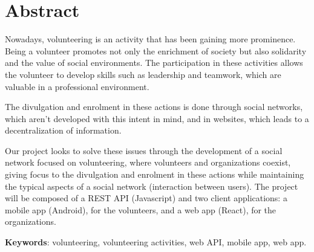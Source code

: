 \section*{Abstract}
Nowadays, volunteering is an activity that has been gaining more prominence.
Being a volunteer promotes not only the enrichment of society but also solidarity and the value of social environments. The participation in these activities allows the volunteer to develop skills such as leadership and teamwork, which are valuable in a professional environment. \par \smallskip
The divulgation and enrolment in these actions is done through social networks, which aren't developed with this intent in mind, and in websites, which leads to a decentralization of information. \par \smallskip
Our project looks to solve these issues through the development of a social network focused on volunteering, where volunteers and organizations coexist, giving focus to the divulgation and enrolment in these actions while maintaining the typical aspects of a social network (interaction between users). The project will be composed of a REST API (Javascript) and two client applications: a mobile app (Android), for the volunteers, and a web app (React), for the organizations. \par \smallskip
\textbf{Keywords}: volunteering, volunteering activities, web API, mobile app, web app.